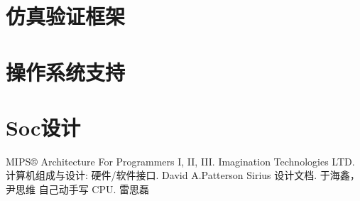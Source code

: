\documentclass[black,normal,cn,hide]{elegantbook}
\begin{document}
\chapter{仿真验证框架}
\chapter{操作系统支持}
\chapter{Soc设计}



\newpage
\renewcommand{\bibname}{参考资料}
\begin{thebibliography}{99}
	 MIPS® Architecture For Programmers I, II, III. Imagination Technologies LTD.  
   计算机组成与设计: 硬件/软件接口. David A.Patterson
   Sirius 设计文档. 于海鑫，尹思维
   自己动手写 CPU. 雷思磊
\end{thebibliography}
\end{document}
